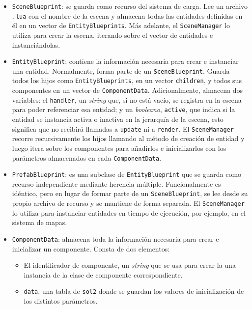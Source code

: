 \begin{itemize}
	\item \texttt{SceneBlueprint}: se guarda como recurso del sistema de carga. Lee un archivo \texttt{.lua} con el nombre de la escena y almacena todas las entidades definidas en él en un vector de \texttt{EntityBlueprints}. Más adelante, el \texttt{SceneManager} lo utiliza para crear la escena, iterando sobre el vector de entidades e instanciándolas. 
	\item \texttt{EntityBlueprint}: contiene la información necesaria para crear e instanciar una entidad. Normalmente, forma parte de un \texttt{SceneBlueprint}. Guarda todos los hijos como \texttt{EntityBlueprints}, en un vector \texttt{children}, y todos sus componentes en un vector de \texttt{ComponentData}. Adicionalmente, almacena dos variables: el \texttt{handler}, un \textit{string} que, si no está vacío, se registra en la escena para poder referenciar esa entidad; y un \textit{booleano}, \texttt{active}, que indica si la entidad se instancia activa o inactiva en la jerarquía de la escena, esto significa que no recibirá llamadas a \texttt{update} ni a \texttt{render}. El \texttt{SceneManager} recorre recursivamente los hijos llamando al método de creación de entidad y luego itera sobre los componentes para añadirlos e inicializarlos con los parámetros almacenados en cada \texttt{ComponentData}. 
	\item \texttt{PrefabBlueprint}: es una subclase de \texttt{EntityBlueprint} que se guarda como recurso independiente mediante herencia múltiple. Funcionalmente es idéntico, pero en lugar de formar parte de un \texttt{SceneBlueprint}, se lee desde su propio archivo de recurso y se mantiene de forma separada. El \texttt{SceneManager} lo utiliza para instanciar entidades en tiempo de ejecución, por ejemplo, en el sistema de mapas.
	\item \texttt{ComponentData}: almacena toda la información necesaria para crear e inicializar un componente. Consta de dos elementos: 
		\begin{itemize}
			\item El identificador de componente, un \textit{string} que se usa para crear la una instancia de la clase de componente correspondiente. 
			\item \texttt{data}, una tabla de \texttt{sol2} donde se guardan los valores de inicialización de los distintos parámetros. 
		\end{itemize}
\end{itemize}

